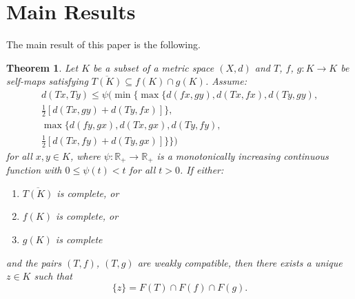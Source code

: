 \documentclass[a4paper,12pt,oneside]{article}
\newtheorem{theorem}{Theorem}[section]
\numberwithin{equation}{section}
\begin{document}
\section{Main Results}

The main result of this paper is the following.
\begin{theorem} \label{Thrm 3.1}
Let $K$ be a subset of a metric space $(X,d)$ and $T$, $f$, $g: K \to K$ be self-maps satisfying $\overline{T(K)} \subseteq f(K) \cap g(K)$. Assume:
\begin{multline} \label{(3.1.1)}
d(Tx,Ty) \leq \psi\Bigg(\min\Bigg\{\max\Big\{d(fx,gy),d(Tx,fx),d(Ty,gy),\\
\tfrac{1}{2}\left[d(Tx,gy) + d(Ty,fx)\right]\Big\}, \\
\max\Big\{d(fy,gx),d(Tx,gx),d(Ty,fy),\\
\tfrac{1}{2}\left[d(Tx,fy) + d(Ty,gx)\right]\Big\}\Bigg\}\Bigg)
\end{multline}
for all $x,y \in K$, where $\psi: \mathbb{R}_{+} \to \mathbb{R}_{+}$ is a monotonically increasing continuous function with $0 \leq \psi(t) < t$ for all $t > 0$. If either:
\begin{enumerate}
    \item[(i)] $\overline{T(K)}$ is complete, or
    \item[(ii)] $f(K)$ is complete, or
    \item[(iii)] $g(K)$ is complete
\end{enumerate}
and the pairs $(T,f)$, $(T,g)$ are weakly compatible, then there exists a unique $z \in K$ such that
\[
\{z\} = F(T) \cap F(f) \cap F(g).
\]
\end{theorem}
\end{document}
